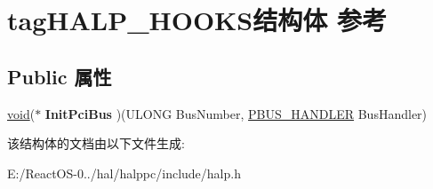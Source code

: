 \hypertarget{structtag_h_a_l_p___h_o_o_k_s}{}\section{tag\+H\+A\+L\+P\+\_\+\+H\+O\+O\+K\+S结构体 参考}
\label{structtag_h_a_l_p___h_o_o_k_s}
\subsection*{Public 属性}
\begin{DoxyCompactItemize}
\item 
\mbox{\label{structtag_h_a_l_p___h_o_o_k_s_a094036ca46cf90e280ea4d601a5cb266}} 
\hyperlink{interfacevoid}{void}($\ast$ {\bfseries Init\+Pci\+Bus} )(U\+L\+O\+NG Bus\+Number, \hyperlink{struct___b_u_s___h_a_n_d_l_e_r}{P\+B\+U\+S\+\_\+\+H\+A\+N\+D\+L\+ER} Bus\+Handler)
\end{DoxyCompactItemize}


该结构体的文档由以下文件生成\+:\begin{DoxyCompactItemize}
\item 
E\+:/\+React\+O\+S-\/0../hal/halppc/include/halp.\+h\end{DoxyCompactItemize}
